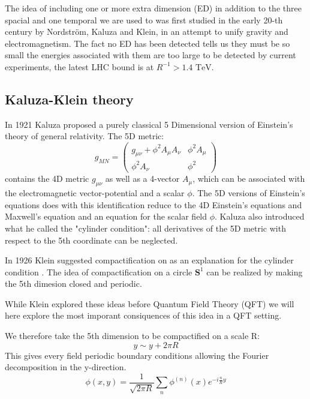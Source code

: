 \documentclass{article}
\begin{document}
The idea of including one or more extra dimension (ED) in addition to the three spacial and one temporal we are used to was first studied in the early 20-th century by Nordström, Kaluza and Klein, in an attempt to unify gravity and electromagnetism. The fact no ED has been detected tells us they must be so small the energies associated with them are too large to be detected by current experiments, the latest LHC bound is at $R^{-1}> 1.4\text{ TeV}$.  


\subsection{Kaluza-Klein theory}
In 1921 Kaluza \cite{kaluza} proposed a purely classical 5 Dimensional version of Einstein's theory of general relativity. The 5D metric:
\begin{equation}
    g_{MN}=\begin{pmatrix}
    g_{\mu\nu}+\phi^2A_\mu A_\nu & \phi^2A_\mu \\ 
    \phi^2A_\nu &\phi^2
    \end{pmatrix}
\end{equation}
contains the 4D metric $g_{\mu\nu}$ as well as a 4-vector $A_\mu$, which can be associated with the electromagnetic vector-potential and a scalar $\phi$. The 5D versions of Einstein's equations does with this identification reduce to the 4D Einstein's equations and Maxwell's equation and an equation for the scalar field $\phi$. Kaluza also introduced what he called the "cylinder condition": all derivatives of the 5D metric with respect to the 5th coordinate can be neglected.    

In 1926 Klein suggested compactification on as an explanation for the cylinder condition \cite{klein}. 
The idea of compactification on a circle $\mathbf{S}^1$ can be realized by making the 5th dimesion closed and periodic.
  
While Klein explored these ideas before Quantum Field Theory (QFT) we will here explore the most imporant consiquences of this idea in a QFT setting. 

We therefore take the 5th dimension to be compactified on a scale R:
\begin{equation}
    y\sim y+2\pi R
    \label{s1}
\end{equation}
This gives every field periodic boundary conditions allowing the Fourier decomposition in the y-direction. 
\begin{equation}
    \phi(x,y)=\frac{1}{\sqrt{2\pi R}}\sum_n \phi^{(n)}(x)e^{-i\frac{n}{R}y}
\end{equation}
\end{document}
